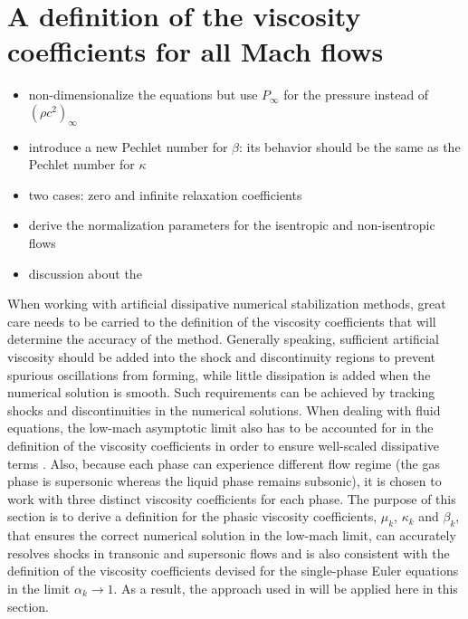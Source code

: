 \documentclass[preprint,10pt]{elsarticle}
\begin{document}
\section{A definition of the viscosity coefficients for all Mach flows}\label{sec:low-Mach}
\begin{itemize}
\item non-dimensionalize the equations but use $P_\infty$ for the pressure instead of $(\rho c^2)_\infty$
\item introduce a new Pechlet number for $\beta$: its behavior should be the same as the Pechlet number for $\kappa$
\item two cases: zero and infinite relaxation coefficients
\item derive the normalization parameters for the isentropic and non-isentropic flows
\item discussion about the 
\end{itemize}
%
When working with artificial dissipative numerical stabilization methods, great care needs to be carried to the definition of the viscosity coefficients that will determine the accuracy of the method. Generally speaking, sufficient artificial viscosity should be added into the shock and discontinuity regions to prevent spurious oscillations from forming, while little dissipation is added when the numerical solution is smooth. Such requirements can be achieved by tracking shocks and discontinuities in the numerical solutions. When dealing with fluid equations, the low-mach asymptotic limit also has to be accounted for in the definition of the viscosity coefficients in order to ensure well-scaled dissipative terms \cite{LowMach1, LowMach2, LowMach3}. Also, because each phase can experience different flow regime (the gas phase is supersonic whereas the liquid phase remains subsonic), it is chosen to work with three distinct viscosity coefficients for each phase. The purpose of this section is to derive a definition for the phasic viscosity coefficients, $\mu_k$, $\kappa_k$ and $\beta_k$, that ensures the correct numerical solution in the low-mach limit, can accurately resolves shocks in transonic and supersonic flows and is also consistent with the definition of the viscosity coefficients devised for the single-phase Euler equations in the limit $\alpha_k \to 1$. As a result, the approach used in \cite{Marco_paper_low_mach} will be applied here in this section. 
\end{document}
